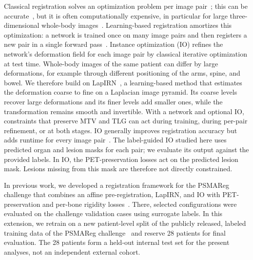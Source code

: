 Classical registration solves an optimization problem per image pair~\cite{ref_demons,ref_syn,bspline}; this can be accurate~\cite{ref_learn2reg_alessa,ref_learn2reg_hansen}, but it is often computationally expensive, in particular for large three-dimensional whole-body images~\cite{ref_voxelmorph_cvpr}.
Learning-based registration amortizes this optimization: a network is trained once on many image pairs and then registers a new pair in a single forward pass~\cite{ref_voxelmorph_tmi,ref_svf_voxelmorph,ref_transmorph}.
Instance optimization (IO) refines the network's deformation field for each image pair by classical iterative optimization at test time.
Whole-body images of the same patient can differ by large deformations, for example through different positioning of the arms, spine, and bowel.
We therefore build on LapIRN~\cite{ref_lapirn}, a learning-based method that estimates the deformation coarse to fine on a Laplacian image pyramid.
Its coarse levels recover large deformations and its finer levels add smaller ones, while the transformation remains smooth and invertible.
With a network and optional IO, constraints that preserve MTV and TLG can act during training, during per-pair refinement, or at both stages.
IO generally improves registration accuracy but adds runtime for every image pair~\cite{ref_learn2reg_alessa}.
The label-guided IO studied here uses predicted organ and lesion masks for each pair; we evaluate its output against the provided labels.
In IO, the PET-preservation losses act on the predicted lesion mask.
Lesions missing from this mask are therefore not directly constrained.

In previous work, we developed a registration framework for the PSMAReg challenge that combines an affine pre-registration, LapIRN, and IO with PET-preservation and per-bone rigidity losses~\cite{ref_koegl_arxiv}.
There, selected configurations were evaluated on the challenge validation cases using surrogate labels.
In this extension, we retrain on a new patient-level split of the publicly released, labeled training data of the PSMAReg challenge~\cite{ref_psmareg_challenge,ref_psmaregdata} and reserve 28 patients for final evaluation.
The 28 patients form a held-out internal test set for the present analyses, not an independent external cohort.

